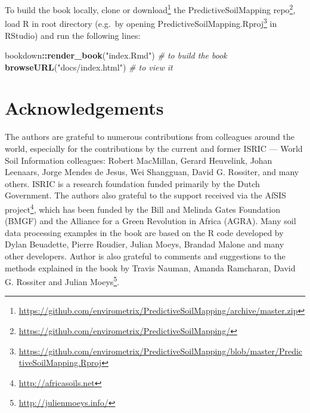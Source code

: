 \documentclass[11pt]{krantz}
\newenvironment{Shaded}{\begin{snugshade}}{\end{snugshade}}
\newcommand{\CommentTok}[1]{\textcolor[rgb]{0.37,0.37,0.37}{\textit{#1}}}
\newcommand{\KeywordTok}[1]{\textcolor[rgb]{0.27,0.27,0.27}{\textbf{#1}}}
\newcommand{\NormalTok}[1]{#1}
\newcommand{\OperatorTok}[1]{\textcolor[rgb]{0.43,0.43,0.43}{\textbf{#1}}}
\newcommand{\StringTok}[1]{\textcolor[rgb]{0.5,0.5,0.5}{#1}}
\renewcommand{\href}[2]{#2\footnote{\url{#1}}}
\theoremstyle{definition}
\theoremstyle{definition}
\theoremstyle{definition}
\theoremstyle{remark}
\begin{document}
To build the book locally, clone or
\href{https://github.com/envirometrix/PredictiveSoilMapping/archive/master.zip}{download}
the
\href{https://github.com/envirometrix/PredictiveSoilMapping/}{PredictiveSoilMapping
repo}, load R in root directory (e.g.~by opening
\href{https://github.com/envirometrix/PredictiveSoilMapping/blob/master/PredictiveSoilMapping.Rproj}{PredictiveSoilMapping.Rproj}
in RStudio) and run the following lines:

\begin{Shaded}
\begin{Highlighting}[]
\NormalTok{bookdown}\OperatorTok{::}\KeywordTok{render_book}\NormalTok{(}\StringTok{"index.Rmd"}\NormalTok{) }\CommentTok{# to build the book}
\KeywordTok{browseURL}\NormalTok{(}\StringTok{"docs/index.html"}\NormalTok{) }\CommentTok{# to view it}
\end{Highlighting}
\end{Shaded}

\hypertarget{acknowledgements}{%
\section*{Acknowledgements}\label{acknowledgements}}


The authors are grateful to numerous contributions from colleagues
around the world, especially for the contributions by the current and
former ISRIC --- World Soil Information colleagues: Robert MacMillan,
Gerard Heuvelink, Johan Leenaars, Jorge Mendes de Jesus, Wei Shangguan,
David G. Rossiter, and many others. ISRIC is a research foundation
funded primarily by the Dutch Government. The authors also grateful to
the support received via the \href{http://africasoils.net}{AfSIS
project}, which has been funded by the Bill and Melinda Gates Foundation
(BMGF) and the Alliance for a Green Revolution in Africa (AGRA). Many
soil data processing examples in the book are based on the R code
developed by Dylan Beuadette, Pierre Roudier, Julian Moeys, Brandad
Malone and many other developers. Author is also grateful to comments
and suggestions to the methods explained in the book by Travis Nauman,
Amanda Ramcharan, David G. Rossiter and
\href{http://julienmoeys.info/}{Julian Moeys}.
\end{document}
